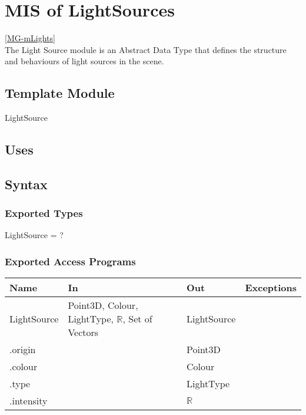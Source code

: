 \documentclass[12pt, titlepage]{article}
\begin{document}
\newpage

\section{MIS of LightSources} \ref{MG-mLights} \\
The Light Source module is an Abstract Data Type that defines the structure and 
behaviours of light sources in the scene.
\subsection{Template Module}
LightSource

\subsection{Uses}
\subsection{Syntax}
\subsubsection{Exported Types}
LightSource = ?

\subsubsection{Exported Access Programs}
\begin{center}
	\begin{tabular}{p{2cm} p{7cm} p{2cm} p{2cm}}
		\hline
		\textbf{Name} & \textbf{In} & \textbf{Out} & \textbf{Exceptions} \\
		\hline
		LightSource & Point3D, Colour, LightType, $\mathbb{R}$, Set of Vectors 
		& 
		LightSource & \\
		.origin & & Point3D & \\
		.colour & & Colour & \\
		.type & & LightType & \\
		.intensity & & $\mathbb{R}$ & \\
		\hline
	\end{tabular}
\end{center}

\end{document}
